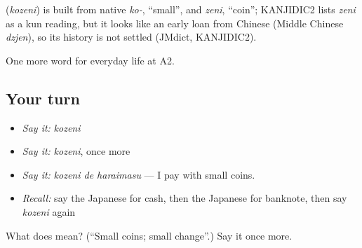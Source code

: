 \begin{cousinweb}
\textbf{} (\emph{kozeni}) is built from native \emph{ko-}, \textquotedblleft{}small\textquotedblright{}, and \emph{zeni}, \textquotedblleft{}coin\textquotedblright{}; KANJIDIC2 lists \emph{zeni} as a kun reading, but it looks like an early loan from Chinese (Middle Chinese \emph{dzjen}), so its history is not settled (JMdict, KANJIDIC2).
\end{cousinweb}

\begin{grammarlens}[title={What you've built}]
One more word for everyday life at A2.
\end{grammarlens}

\subsection*{Your turn}
\begin{itemize}
\raggedright
  \item \emph{Say it:} \emph{kozeni}
  \item \emph{Say it:} \emph{kozeni}, once more
  \item \emph{Say it:} \emph{kozeni de haraimasu} — I pay with small coins.
  \item \emph{Recall:} say the Japanese for cash, then the Japanese for banknote, then say \emph{kozeni} again
\end{itemize}

\begin{tcolorbox}[breakable,colback=teal!4,colframe=teal!35!black,title={Before you move on}]
What does  mean? (\textquotedblleft{}Small coins; small change\textquotedblright{}.) Say it once more.
\end{tcolorbox}
